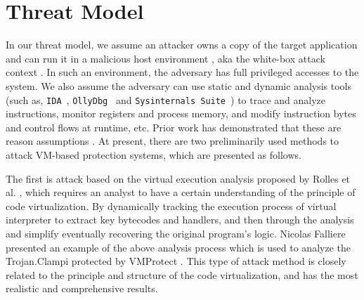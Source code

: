 \section{Threat Model}\label{sec:threat-model}
In our threat model, we assume an attacker owns a copy of the target application and can run it in a malicious host environment \cite{collberg2002watermarking}, aka the white-box attack context \cite{chow2003white,liem2008compiler}.
In such an environment, the adversary has full privileged accesses to the system. We also assume the adversary can use static and dynamic analysis tools (such as, \texttt{IDA}~\cite{ida}, \texttt{OllyDbg}~\cite{od} and \texttt{Sysinternals Suite}~\cite{sysinternals}) to trace and analyze instructions, monitor registers and process memory, and modify instruction bytes and control flows at runtime, etc.
Prior work has demonstrated that these are reason assumptions .
At present, there are two preliminarily used methods to attack VM-based protection systems, which are presented as follows. 

The first is attack based on the virtual execution analysis proposed by Rolles et al. \cite{rolles2009unpacking}, which requires an analyst to have a certain understanding of the principle of code virtualization. By dynamically tracking the execution process of virtual interpreter to extract key bytecodes and handlers, and then through the analysis and simplify eventually recovering the original program's logic. Nicolas Falliere \cite{falliere2009inside} presented an example of the above analysis process which is used to analyze the Trojan.Clampi protected by VMProtect \cite{vmp}. 
This type of attack method is closely related to the principle and structure of the code virtualization, and has the most realistic and comprehensive results.


